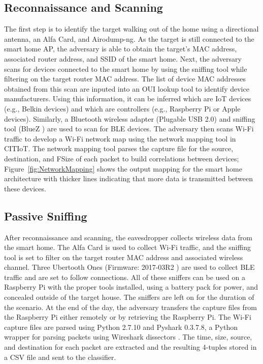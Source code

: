 \documentclass[conference]{./IEEEtran/IEEEtran}
\begin{document}
\subsection{Reconnaissance and Scanning}

The first step is to identify the target walking out of the home using a directional antenna, an Alfa Card, and Airodump-ng. As the target is still connected to the smart home \ac{AP}, the adversary is able to obtain the target's \ac{MAC} address, associated router address, and \ac{SSID} of the smart home. Next, the adversary scans for devices connected to the smart home by using the sniffing tool while filtering on the target router \ac{MAC} address. The list of device \ac{MAC} addresses obtained from this scan are inputed into an \ac{OUI} lookup tool to identify device manufacturers. Using this information, it can be inferred which are \ac{IoT} devices (e.g., Belkin devices) and which are controllers (e.g., Raspberry Pi or Apple devices). Similarly, a Bluetooth wireless adapter (Plugable USB 2.0)  and sniffing tool (BlueZ \cite{Bluez}) are used to scan for \ac{BLE} devices. The adversary then scans Wi-Fi traffic to develop a Wi-Fi network map using the network mapping tool in CITIoT. The network mapping tool parses the capture file for the source, destination, and \ac{FSize} of each packet to build correlations between devices; Figure~\ref{fig:NetworkMapping} shows the output mapping for the smart home architecture with thicker lines indicating that more data is transmitted between these devices.

\figNetworkMapping

\subsection{Passive Sniffing}

After reconnaissance and scanning, the eavesdropper collects wireless data from the smart home. The Alfa Card is used to collect Wi-Fi traffic, and the sniffing tool is set to filter on the target router \ac{MAC} address and associated wireless channel. Three Ubertooth Ones (Firmware: 2017-03R2 \cite{Ubertooth}) are used to collect \ac{BLE} traffic and are set to follow connections. All of these sniffers can be used on a Raspberry Pi with the proper tools installed, using a battery pack for power, and concealed outside of the target house. The sniffers are left on for the duration of the scenario. At the end of the day, the adversary transfers the capture files from the Raspberry Pi either remotely or by retrieving the Raspberry Pi. The Wi-Fi capture files are parsed using Python 2.7.10 and Pyshark 0.3.7.8, a Python wrapper for parsing packets using Wireshark dissectors \cite{Pyshark}. The time, size, source, and destination for each packet are extracted and the resulting 4-tuples stored in a \ac{CSV} file and sent to the classifier. 
\end{document}
